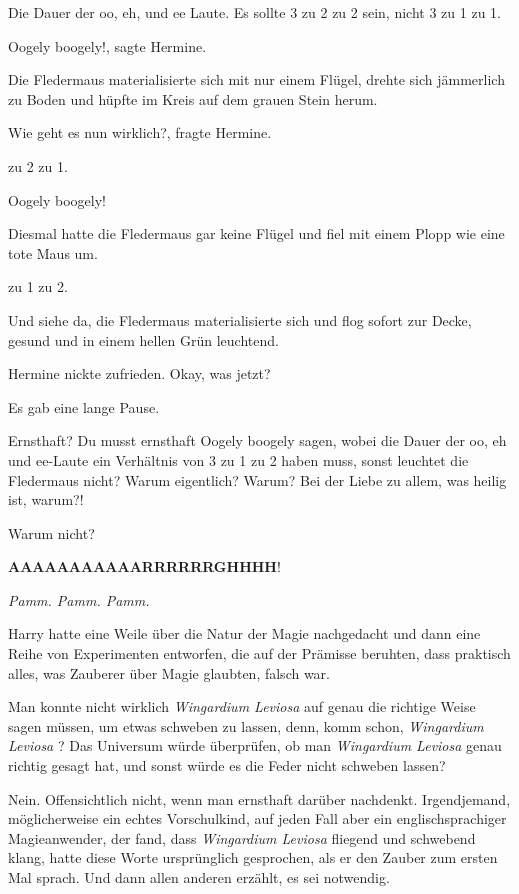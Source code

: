 \glqq Die Dauer der oo, eh, und ee Laute. Es sollte 3 zu 2 zu 2 sein, nicht 3 zu
1 zu 1.\grqq{}

\glqq Oogely boogely!\grqq{}, sagte Hermine.

Die Fledermaus materialisierte sich mit nur einem Flügel, drehte sich jämmerlich
zu Boden und hüpfte im Kreis auf dem grauen Stein herum.

\glqq Wie geht es nun wirklich?\grqq{}, fragte Hermine.

 zu 2 zu 1.\grqq{}

\glqq Oogely boogely!\grqq{}

Diesmal hatte die Fledermaus gar keine Flügel und fiel mit einem Plopp wie eine
tote Maus um.

 zu 1 zu 2.\grqq{}

Und siehe da, die Fledermaus materialisierte sich und flog sofort zur Decke,
gesund und in einem hellen Grün leuchtend.

Hermine nickte zufrieden. \glqq Okay, was jetzt?\grqq{}

Es gab eine lange Pause.

\glqq Ernsthaft? Du musst ernsthaft Oogely boogely sagen, wobei die Dauer der
oo, eh und ee-Laute ein Verhältnis von 3 zu 1 zu 2 haben muss, sonst leuchtet
die Fledermaus nicht? Warum eigentlich? Warum? Bei der Liebe zu allem, was
heilig ist, warum?!\grqq{}

\glqq Warum nicht?\grqq{}

\glqq \textbf{AAAAAAAAAAARRRRRRGHHHH}!\grqq{}

\emph{Pamm. Pamm. Pamm.}

Harry hatte eine Weile über die Natur der Magie nachgedacht und dann eine Reihe
von Experimenten entworfen, die auf der Prämisse beruhten, dass praktisch alles,
was Zauberer über Magie glaubten, falsch war.

Man konnte nicht wirklich \emph{\glqq Wingardium Leviosa\grqq{} } auf genau die
richtige Weise sagen müssen, um etwas schweben zu lassen, denn, komm schon,
\emph{\glqq Wingardium Leviosa\grqq{} }? Das Universum würde überprüfen, ob man
\emph{\glqq Wingardium Leviosa\grqq{} } genau richtig gesagt hat, und sonst
würde es die Feder nicht schweben lassen?

Nein. Offensichtlich nicht, wenn man ernsthaft darüber nachdenkt. Irgendjemand,
möglicherweise ein echtes Vorschulkind, auf jeden Fall aber ein
englischsprachiger Magieanwender, der fand, dass \emph{\glqq Wingardium
Leviosa\grqq{} } fliegend und schwebend klang, hatte diese Worte ursprünglich
gesprochen, als er den Zauber zum ersten Mal sprach. Und dann allen anderen
erzählt, es sei notwendig.

